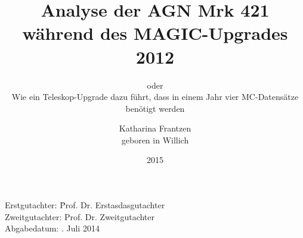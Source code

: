 








\newcommand{\thetitle}{Analyse der AGN Mrk 421\\ während des MAGIC-Upgrades 2012}
\newcommand{\thesubtitle}{oder\\ Wie ein Teleskop-Upgrade dazu führt, dass in einem Jahr vier MC-Datensätze benötigt werden}
\newcommand{\Geburtsort}{Willich}
\newcommand{\Jahr}{2015}
\newcommand{\Lehrstuhl}{Experimentelle Physik V}
\newcommand{\Betreuer}{Prof. Dr. Erstasdasgutachter}
\newcommand{\Zweitgutachter}{Prof. Dr. Zweitgutachter}
\newcommand{\Abgabedatum}{11. Juli 2014}

\author{
   Katharina Frantzen\\
   geboren in \Geburtsort
}

\titlehead{
   \texttt{[image: logos/tu-logo.pdf]}
}
\title{\thetitle}
\subtitle{\thesubtitle}

\date{\Jahr}

\subject{Arbeit zur Erlangung des akademischen Grades\\Bachelor of Science}
\publishers{Lehrstuhl für \Lehrstuhl \\ Fakultät Physik \\ Technische Universität Dortmund}



\frontmatter
\maketitle
\thispagestyle{empty}
\vspace*{\fill}
\begin{tabbing}
   Erstgutachter: \hspace{3em}\=   \Betreuer \\ 
   Zweitgutachter: \> \Zweitgutachter\\
   Abgabedatum: \>\Abgabedatum
\end{tabbing}
\newpage

